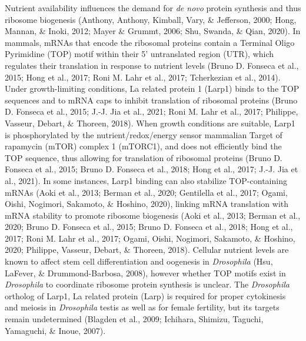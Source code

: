 \documentclass[12pt,oneside]{reedthesis}
\begin{document}
Nutrient availability influences the demand for \emph{de novo} protein synthesis and thus ribosome biogenesis (Anthony, Anthony, Kimball, Vary, \& Jefferson, 2000; Hong, Mannan, \& Inoki, 2012; Mayer \& Grummt, 2006; Shu, Swanda, \& Qian, 2020). In mammals, mRNAs that encode the ribosomal proteins contain a Terminal Oligo Pyrimidine (TOP) motif within their 5' untranslated region (UTR), which regulates their translation in response to nutrient levels (Bruno D. Fonseca et al., 2015; Hong et al., 2017; Roni M. Lahr et al., 2017; Tcherkezian et al., 2014). Under growth-limiting conditions, La related protein 1 (Larp1) binds to the TOP sequences and to mRNA caps to inhibit translation of ribosomal proteins (Bruno D. Fonseca et al., 2015; J.-J. Jia et al., 2021; Roni M. Lahr et al., 2017; Philippe, Vasseur, Debart, \& Thoreen, 2018). When growth conditions are suitable, Larp1 is phosphorylated by the nutrient/redox/energy sensor mammalian Target of rapamycin (mTOR) complex 1 (mTORC1), and does not efficiently bind the TOP sequence, thus allowing for translation of ribosomal proteins (Bruno D. Fonseca et al., 2015; Bruno D. Fonseca et al., 2018; Hong et al., 2017; J.-J. Jia et al., 2021). In some instances, Larp1 binding can also stabilize TOP-containing mRNAs (Aoki et al., 2013; Berman et al., 2020; Gentilella et al., 2017; Ogami, Oishi, Nogimori, Sakamoto, \& Hoshino, 2020), linking mRNA translation with mRNA stability to promote ribosome biogenesis (Aoki et al., 2013; Berman et al., 2020; Bruno D. Fonseca et al., 2015; Bruno D. Fonseca et al., 2018; Hong et al., 2017; Roni M. Lahr et al., 2017; Ogami, Oishi, Nogimori, Sakamoto, \& Hoshino, 2020; Philippe, Vasseur, Debart, \& Thoreen, 2018). Cellular nutrient levels are known to affect stem cell differentiation and oogenesis in \emph{Drosophila} (Hsu, LaFever, \& Drummond-Barbosa, 2008), however whether TOP motifs exist in \emph{Drosophila} to coordinate ribosome protein synthesis is unclear. The \emph{Drosophila} ortholog of Larp1, La related protein (Larp) is required for proper cytokinesis and meiosis in \emph{Drosophila} testis as well as for female fertility, but its targets remain undetermined (Blagden et al., 2009; Ichihara, Shimizu, Taguchi, Yamaguchi, \& Inoue, 2007).
\end{document}
